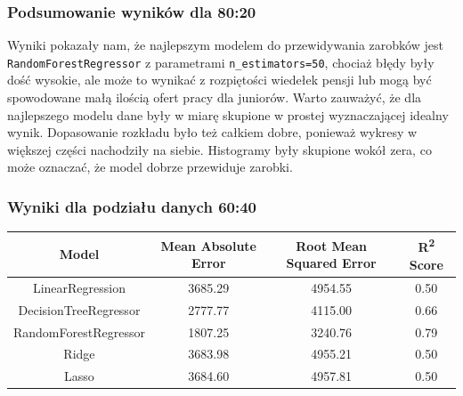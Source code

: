 \documentclass[a4paper]{article}
\begin{document}
\subsubsection{Podsumowanie wyników dla 80:20}

\quad Wyniki pokazały nam, że najlepszym modelem do przewidywania zarobków jest \texttt{RandomForestRegressor} z parametrami \texttt{n\_estimators=50},
chociaż błędy były dość wysokie, ale może to wynikać z rozpiętości wiedełek pensji lub mogą być spowodowane małą ilością ofert pracy dla juniorów. Warto zauważyć, że
dla najlepszego modelu dane były w miarę skupione w prostej wyznaczającej idealny wynik. Dopasowanie rozkładu było też całkiem dobre, ponieważ
wykresy w większej części nachodziły na siebie. Histogramy były skupione wokół zera, co może oznaczać, że model dobrze przewiduje zarobki.


\subsubsection{Wyniki dla podziału danych 60:40}

\begin{table}[H]
    \centering
    \begin{tabular}{|c|c|c|c|}
        \hline
        \textbf{Model}        & \textbf{Mean Absolute Error} & \textbf{Root Mean Squared Error} & \textbf{R\textsuperscript{2} Score} \\ \hline
        LinearRegression      & 3685.29                      & 4954.55                          & 0.50                                \\ \hline
        DecisionTreeRegressor & 2777.77                      & 4115.00                          & 0.66                                \\ \hline
        RandomForestRegressor & 1807.25                      & 3240.76                          & 0.79                                \\ \hline
        Ridge                 & 3683.98                      & 4955.21                          & 0.50                                \\ \hline
        Lasso                 & 3684.60                      & 4957.81                          & 0.50                                \\ \hline
    \end{tabular}
\end{table}
\end{document}
